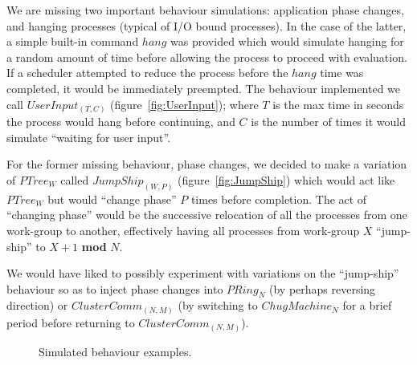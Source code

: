 We are missing two important behaviour simulations: application phase changes,
and hanging processes (typical of I/O bound processes). In the case of the 
latter, a simple built-in command $hang$ was provided which would simulate 
hanging for a random amount of time before allowing the process to proceed with
evaluation. If a scheduler attempted to reduce the process before the $hang$ 
time was completed, it would be immediately preempted. The behaviour 
implemented we call $UserInput_{(T,C)}$ (figure~\ref{fig:UserInput}); where $T$ is the max time in seconds
the process would hang before continuing, and $C$ is the number of times it 
would simulate ``waiting for user input''.

For the former missing behaviour, phase changes, we decided to make a variation
of $PTree_W$ called $JumpShip_{(W,P)}$ (figure~\ref{fig:JumpShip}) which would act like $PTree_W$ but would
``change phase'' $P$ times before completion. The act of ``changing phase'' would 
be the successive relocation of all the processes from one work-group to 
another, effectively having all processes from work-group $X$ ``jump-ship'' to
$X+1$ \textbf{mod} $N$.

We would have liked to possibly experiment with variations on the ``jump-ship''
behaviour so as to inject phase changes into $PRing_N$ (by perhaps reversing
direction) or $ClusterComm_{(N,M)}$ (by switching to $ChugMachine_N$ for a 
brief period before returning to $ClusterComm_{(N,M)}$).

\begin{figure}
\hfill
{}

\hfill
{}

\hfill
{}
\caption{Simulated behaviour examples.}
\end{figure}


